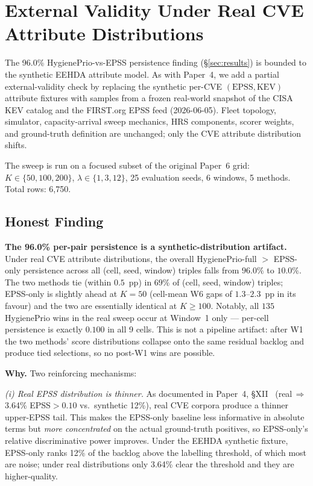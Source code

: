 \section{External Validity Under Real CVE Attribute Distributions}
\label{sec:external_validity}

The 96.0\% HygienePrio-vs-EPSS persistence finding (\S\ref{sec:results})
is bounded to the synthetic EEHDA attribute model. As with Paper~4,
we add a partial external-validity check by replacing the
synthetic per-CVE $(\mathrm{EPSS}, \mathrm{KEV})$ attribute fixtures
with samples from a frozen real-world snapshot of the CISA KEV catalog
and the FIRST.org EPSS feed (2026-06-05). Fleet topology, simulator,
capacity-arrival sweep mechanics, HRS components, scorer weights, and
ground-truth definition are unchanged; only the CVE attribute
distribution shifts.

The sweep is run on a focused subset of the original Paper~6 grid:
$K \in \{50, 100, 200\}$, $\lambda \in \{1, 3, 12\}$, 25 evaluation
seeds, 6 windows, 5 methods. Total rows: 6{,}750.



\subsection{Honest Finding}

\textbf{The 96.0\% per-pair persistence is a synthetic-distribution
artifact.} Under real CVE attribute distributions, the overall
HygienePrio-full $>$ EPSS-only persistence across all
(cell, seed, window) triples falls from $96.0\%$ to $\mathbf{10.0\%}$.
The two methods tie (within $0.5$~pp) in $69\%$ of (cell, seed, window)
triples; EPSS-only is slightly ahead at $K = 50$ (cell-mean W6 gaps of
$1.3$--$2.3$~pp in its favour) and the two are essentially identical
at $K \geq 100$. Notably, all $135$ HygienePrio wins in the real sweep
occur at Window~1 only --- per-cell persistence is exactly $0.100$ in
all 9 cells. This is not a pipeline artifact: after W1 the two methods'
score distributions collapse onto the same residual backlog and produce
tied selections, so no post-W1 wins are possible.

\textbf{Why.} Two reinforcing mechanisms:

\textit{(i) Real EPSS distribution is thinner.} As documented in
Paper~4, \S XII~\cite{paper4hygieneprio} (real$\,\Rightarrow\,$3.64\%
EPSS$>0.10$ vs.\ synthetic 12\%), real CVE corpora produce a thinner
upper-EPSS tail. This makes the EPSS-only baseline less informative
in absolute terms but \emph{more concentrated} on the actual
ground-truth positives, so EPSS-only's relative discriminative power
improves. Under the EEHDA synthetic fixture, EPSS-only ranks 12\% of
the backlog above the labelling threshold, of which most are noise;
under real distributions only 3.64\% clear the threshold and they
are higher-quality.

